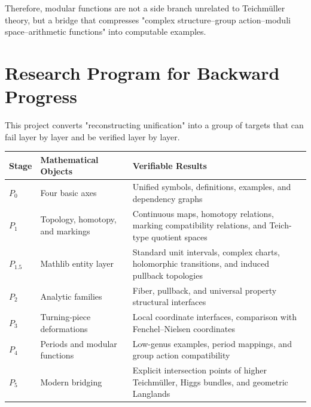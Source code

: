 \documentclass[UTF8,a4paper,11pt]{article}
\begin{document}
Therefore, modular functions are not a side branch unrelated to Teichmüller theory, but a bridge that compresses "complex structure--group action--moduli space--arithmetic functions" into computable examples.

\section{Research Program for Backward Progress}

This project converts "reconstructing unification" into a group of targets that can fail layer by layer and be verified layer by layer.

\begin{longtable}{p{}p{}p{}}
\toprule
Stage & Mathematical Objects & Verifiable Results \\
\midrule
$P_0$ & Four basic axes & Unified symbols, definitions, examples, and dependency graphs \\
$P_1$ & Topology, homotopy, and markings & Continuous maps, homotopy relations, marking compatibility relations, and Teich-type quotient spaces \\
$P_{1.5}$ & Mathlib entity layer & Standard unit intervals, complex charts, holomorphic transitions, and induced pullback topologies \\
$P_2$ & Analytic families & Fiber, pullback, and universal property structural interfaces \\
$P_3$ & Turning-piece deformations & Local coordinate interfaces, comparison with Fenchel--Nielsen coordinates \\
$P_4$ & Periods and modular functions & Low-genus examples, period mappings, and group action compatibility \\
$P_5$ & Modern bridging & Explicit intersection points of higher Teichmüller, Higgs bundles, and geometric Langlands \\
\bottomrule
\end{longtable}
\end{document}
